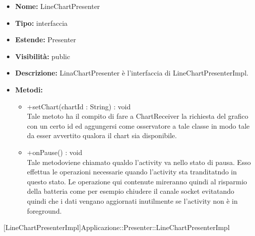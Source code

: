 			
			\begin{itemize}
			\item \textbf{Nome:} LineChartPresenter
			\item \textbf{Tipo:} interfaccia
			
		\item \textbf{Estende:}
		Presenter
			\item \textbf{Visibilità:} public
			\item \textbf{Descrizione:} LinaChartPresenter è l'interfaccia di LineChartPresenterImpl.
			\item \textbf{Metodi:}
				\begin{itemize}
				\setlength{\itemsep}{5pt}
				
					\item[\ding{111}] {{+setChart(chartId : String) : void}} \\ [1mm] Tale metoto ha il compito di fare a ChartReceiver la richiesta del grafico con un certo id ed aggungersi come osservatore a tale classe in modo tale da esser avvertito qualora il chart sia disponibile.
					\item[\ding{111}] {{+onPause() : void}} \\ [1mm] Tale metodoviene chiamato qualdo l'activity va nello stato di pausa. Esso effettua le operazioni necessarie quando l'activity sta tranditatndo in questo stato. Le operazione qui contenute mireranno quindi al risparmio della batteria come per esempio chiudere il canale socket evitatando quindi che i dati vengano aggiornati inutilmente se l'activity non è in foreground.
				\end{itemize}
		
			\end{itemize}

			
			[LineChartPresenterImpl]{Applicazione::Presenter::LineChartPresenterImpl}
			

	
